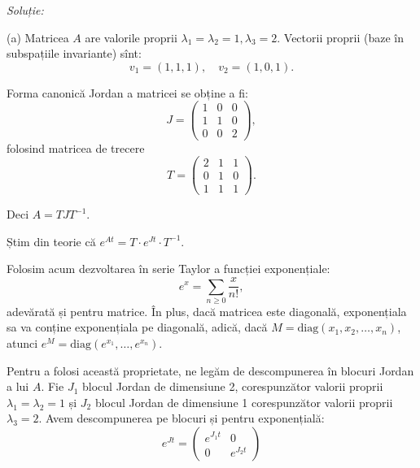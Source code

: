 \emph{Soluție:}

(a) Matricea $A$ are valorile proprii $\lambda_1 = \lambda_2 = 1, \lambda_3 = 2$.
Vectorii proprii (baze în subspațiile invariante) sînt:
\[
  v_1 = (1, 1, 1), \quad v_2 = (1, 0, 1).
\]

Forma canonică Jordan a matricei se obține a fi:
\[
  J = \begin{pmatrix}
    1 & 0 & 0 \\
    1 & 1 & 0 \\
    0 & 0 & 2
  \end{pmatrix},
\]
folosind matricea de trecere
\[
  T = \begin{pmatrix}
    2 & 1 & 1 \\ 0 & 1 & 0 \\ 1 & 1 & 1
  \end{pmatrix}.
\]

Deci $A = TJT^{-1}$.

Știm din teorie că $e^{At} = T \cdot e^{Jt} \cdot T^{-1}$.

Folosim acum dezvoltarea în serie Taylor a funcției exponențiale:
\[
  e^x = \sum_{n \geq 0} \frac{x}{n!},
\]
adevărată și pentru matrice. În plus, dacă matricea este diagonală,
exponențiala sa va conține ex\-po\-nen\-ți\-a\-la pe diagonală, adică, dacă
$M = \mathrm{diag}(x_1, x_2, \dots, x_n)$, atunci
$e^M = \mathrm{diag}(e^{x_1},\dots, e^{x_n})$.

Pentru a folosi această proprietate, ne legăm de descompunerea în blocuri
Jordan a lui $A$. Fie $J_1$ blocul Jordan de dimensiune 2, corespunzător
valorii proprii $\lambda_1 = \lambda_2 = 1$ și $J_2$ blocul Jordan de dimensiune 1
corespunzător valorii proprii $\lambda_3 = 2$. Avem descompunerea pe blocuri și
pentru exponențială:
\[
  e^{Jt} = \begin{pmatrix}
    e^{J_1 t} & 0 \\
    0 & e^{J_2 t}
  \end{pmatrix}
\]

